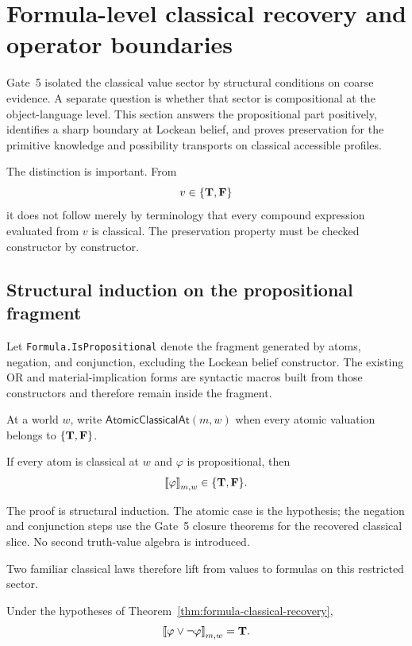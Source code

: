 \section{Formula-level classical recovery and operator boundaries}
\label{sec:formula-classical-recovery}

Gate~5 isolated the classical value sector by structural conditions on coarse
evidence.  A separate question is whether that sector is compositional at the
object-language level.  This section answers the propositional part positively,
identifies a sharp boundary at Lockean belief, and proves preservation for the
primitive knowledge and possibility transports on classical accessible profiles.

The distinction is important.  From
\[
  v\in\{\mathbf{T},\mathbf{F}\}
\]
it does not follow merely by terminology that every compound expression evaluated
from \(v\) is classical.  The preservation property must be checked constructor by
constructor.

\subsection{Structural induction on the propositional fragment}

Let \texttt{Formula.IsPropositional} denote the fragment generated by atoms,
negation, and conjunction, excluding the Lockean belief constructor.  The existing
OR and material-implication forms are syntactic macros built from those constructors
and therefore remain inside the fragment.

At a world \(w\), write \(\mathsf{AtomicClassicalAt}(m,w)\) when every atomic
valuation belongs to \(\{\mathbf{T},\mathbf{F}\}\).

\begin{theorem}
\label{thm:formula-classical-recovery}
If every atom is classical at \(w\) and \(\varphi\) is propositional, then
\[
  \mathopen{[\![}\varphi\mathclose{]\!]}_{m,w}\in\{\mathbf{T},\mathbf{F}\}.
\]
\statusverified
\end{theorem}

The proof is structural induction.  The atomic case is the hypothesis; the negation
and conjunction steps use the Gate~5 closure theorems for the recovered classical
slice.  No second truth-value algebra is introduced.

Two familiar classical laws therefore lift from values to formulas on this restricted
sector.

\begin{corollary}
\label{cor:formula-lem-recovery}
Under the hypotheses of Theorem~\ref{thm:formula-classical-recovery},
\[
  \mathopen{[\![}\varphi\lor\neg\varphi\mathclose{]\!]}_{m,w}=\mathbf{T}.
\]
\statusverified
\end{corollary}

